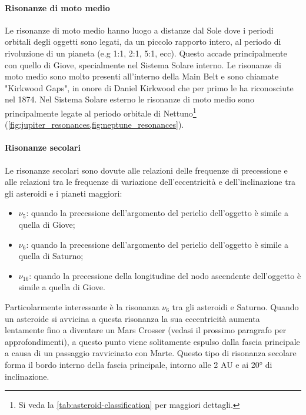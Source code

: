 \documentclass[a4paper,11pt,openright]{book}
\begin{document}
\paragraph*{Risonanze di moto medio} 
Le risonanze di moto medio hanno luogo a distanze dal Sole dove i periodi orbitali degli oggetti sono legati, da un piccolo rapporto intero, al periodo di rivoluzione di un pianeta (e.g 1:1, 2:1, 5:1, ecc). Questo accade principalmente con quello di Giove, specialmente nel Sistema Solare interno. Le risonanze di moto medio sono molto presenti all'interno della Main Belt e sono chiamate "Kirkwood Gaps", in onore di Daniel Kirkwood che per primo le ha riconosciute nel 1874. Nel Sistema Solare esterno le risonanze di moto medio sono principalmente legate al periodo orbitale di Nettuno\footnote{Si veda la \cref{tab:asteroid-classification} per maggiori dettagli.} (\cref{fig:jupiter_resonances,fig:neptune_resonances}).

\paragraph*{Risonanze secolari}
Le risonanze secolari sono dovute alle relazioni delle frequenze di precessione e alle relazioni tra le frequenze di variazione dell'eccentricità e dell'inclinazione tra gli asteroidi e i pianeti maggiori:
\begin{itemize}
    \item $\nu_5$: quando la precessione dell'argomento del perielio dell'oggetto è simile a quella di Giove;
    \item $\nu_6$: quando la precessione dell'argomento del perielio dell'oggetto è simile a quella di Saturno;
    \item $\nu_{16}$: quando la precessione della longitudine del nodo ascendente dell'oggetto è simile a quella di Giove.
\end{itemize} 
Particolarmente interessante è la risonanza $\nu_6$ tra gli asteroidi e Saturno. Quando un asteroide si avvicina a questa risonanza la sua eccentricità aumenta lentamente fino a diventare un Mars Crosser (vedasi il prossimo paragrafo per approfondimenti), a questo punto viene solitamente espulso dalla fascia principale a causa di un passaggio ravvicinato con Marte. Questo tipo di risonanza secolare forma il bordo interno della fascia principale, intorno alle 2 AU e ai 20° di inclinazione.
\end{document}
